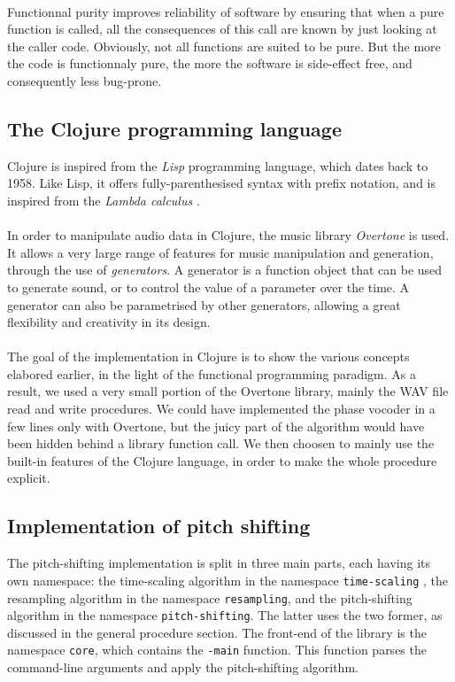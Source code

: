\documentclass[letterpaper]{article}
\newcommand*{\codeinl}{\texttt}
\theoremstyle{definition}
\theoremstyle{remark}
\begin{document}
\paragraph{}
Functionnal purity improves reliability of software by ensuring that when a pure
function is called, all the consequences of this call are known by just looking
at the caller code. Obviously, not all functions are suited to be pure. But the
more the code is functionnaly pure, the more the software is side-effect free,
and consequently less bug-prone.

\subsection{The Clojure programming language}
Clojure is inspired from the \emph{Lisp} programming language, which dates back
to 1958. Like Lisp, it offers fully-parenthesised syntax with prefix notation,
and is inspired from the \emph{Lambda calculus} \citep{Rojas_atutorial}.

\paragraph{}
In order to manipulate audio data in Clojure, the music library \emph{Overtone}
is used. It allows a very large range of features for music manipulation and
generation, through the use of \emph{generators}. A generator is a function
object that can be used to generate sound, or to control the value of a
parameter over the time. A generator can also be parametrised by other
generators, allowing a great flexibility and creativity in its design.

\paragraph{}
The goal of the implementation in Clojure is to show the various concepts
elabored earlier, in the light of the functional programming paradigm. As a
result, we used a very small portion of the Overtone library, mainly the WAV
file read and write procedures. We could have implemented the phase vocoder in a
few lines only with Overtone, but the juicy part of the algorithm would have
been hidden behind a library function call. We then choosen to mainly use the
built-in features of the Clojure language, in order to make the whole procedure
explicit.

\subsection{Implementation of pitch shifting}
The pitch-shifting implementation is split in three main parts, each having its
own namespace: the time-scaling algorithm in the namespace
\codeinl{time-scaling} , the resampling algorithm in the namespace
\codeinl{resampling}, and the pitch-shifting algorithm in the namespace
\codeinl{pitch-shifting}. The latter uses the two former, as discussed in the
general procedure section. The front-end of the library is the namespace
\codeinl{core}, which contains the \codeinl{-main} function. This function
parses the command-line arguments and apply the pitch-shifting algorithm.
\end{document}
